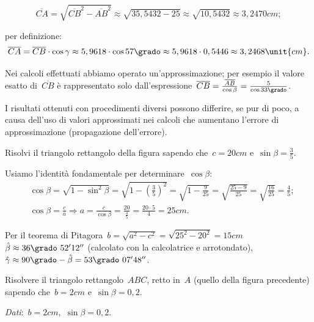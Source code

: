 \begin{exrig}
\begin{esempio}
\begin{itemize*}
\[\overline{CA}=\sqrt{\overline{CB}^{2}-\overline{AB}^{2}}\approx\sqrt{35,
5432-25}\approx\sqrt{10,5432}\approx3,2470\unit{cm};\]
 \item per definizione:
 \[\overline{CA}=\overline{CB}\cdot \cos \gamma\approx5,9618 \cdot 
\cos 57\grado \approx5,9618\cdot 0,5446\approx3,2468\unit{cm}.\]
\end{itemize*}
\osservazione
\begin{enumeratea}
\item Nei calcoli effettuati abbiamo operato un'approssimazione; per esempio il 
valore esatto di~$\overline{CB}$ è rappresentato solo
dall'espressione~$\overline{CB}=\frac{\overline{AB}}{\cos 
\beta}=\frac{5}{\cos 33\grado}$.
\item I risultati ottenuti con procedimenti diversi possono differire, se pur di 
poco, a causa dell'uso di valori approssimati
nei calcoli che aumentano l'errore di approssimazione (propagazione 
dell'errore).
\end{enumeratea}
 \end{esempio}

 \begin{esempio}
Risolvi il triangolo rettangolo della figura sapendo che~$c=20\unit{cm}$ e~$\sin 
\beta=\frac{3}{5}$.
\begin{center}
 
\end{center}
Usiamo l'identità fondamentale per determinare~$\cos \beta$:
\begin{align*}
&\cos \beta=\sqrt{1-\sin^{2} 
\beta}=\sqrt{1-\left(\frac{3}{5}\right)^{2}}=\sqrt{1-\frac{9}{25}}=
    \sqrt{\frac{25-9}{25}}=\sqrt{\frac{16}{25}}=\frac{4}{5};\\
&\cos \beta=\frac{c}{a}\Rightarrow a=\frac{c}{\cos \beta} = 
\frac{20}{\frac{4}{5}}=\frac{20\cdot{5}}{4}=25\unit{cm}.
\end{align*}

Per il teorema di 
Pitagora~$b=\sqrt{a^{2}-c^{2}}=\sqrt{25^{2}-20^{2}}=15\unit{cm}$
$\hat{\beta}\approx36\grado~52' 12''$ (calcolato con la calcolatrice e 
arrotondato), $\hat{\gamma}\approx90\grado - \hat{\beta} = 53\grado~07'48''$.
 \end{esempio}

 \begin{esempio}
Risolvere il triangolo rettangolo~$ABC$, retto in~$A$ (quello della figura 
precedente) sapendo che~$b=2\unit{cm}$ e~$\sin \beta=0,2$.

\emph{Dati}:~$b=2\unit{cm}$,\quad~$\sin \beta=0,2$.


\end{esempio}
\end{exrig}
